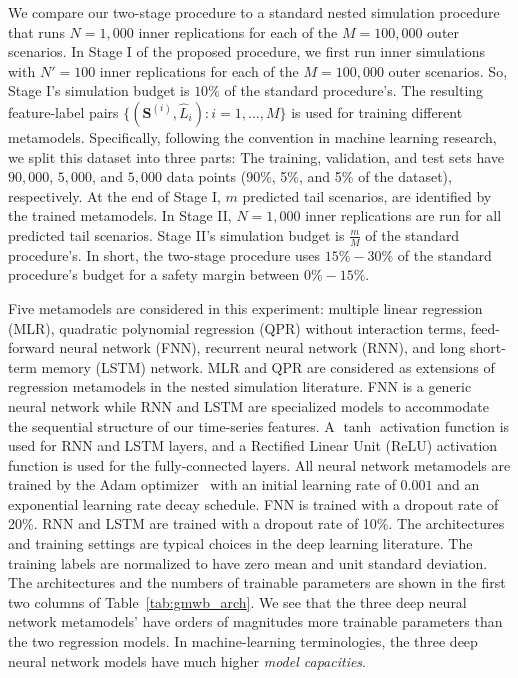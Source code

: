 \documentclass[]{article}
\newcommand{\bS}{\bm{S}}
\newcommand{\Lhat}{\widehat{L}}
\begin{document}
We compare our two-stage procedure to a standard nested simulation procedure that runs $N=1\!,\!000$ inner replications for each of the $M=100\!,\!000$ outer scenarios.
In Stage I of the proposed procedure, we first run inner simulations with $N'=100$ inner replications for each of the $M=100\!,\!000$ outer scenarios.
So, Stage I's simulation budget is $10\%$ of the standard procedure's.
The resulting feature-label pairs $\{(\bS^{(i)}, \Lhat_i): i=1,\ldots,M\}$ is used for training different  metamodels.
Specifically, following the convention in machine learning research, we split this dataset into three parts: The training, validation, and test sets have $90\!,\!000$, $5\!,\!000$, and $5\!,\!000$ data points (90\%, 5\%, and 5\% of the dataset), respectively.
At the end of Stage I, $m$ predicted tail scenarios, are identified by the trained metamodels.
In Stage II, $N=1\!,\!000$ inner replications are run for all predicted tail scenarios.
Stage II's simulation budget is $\frac{m}{M}$ of the standard procedure's.
In short, the two-stage procedure uses $15\% - 30\%$ of the standard procedure's budget for a safety margin between $0\% - 15\%$.

Five metamodels are considered in this experiment: multiple linear regression (MLR), quadratic polynomial regression (QPR) without interaction terms, feed-forward neural network (FNN), recurrent neural network (RNN), and long short-term memory (LSTM) network.
MLR and QPR are considered as extensions of regression metamodels in the nested simulation literature.
FNN is a generic neural network while RNN and LSTM are specialized models to accommodate the sequential structure of our time-series features.
A $\tanh$ activation function is used for RNN and LSTM layers, and a Rectified Linear Unit (ReLU) activation function is used for the fully-connected layers.
All neural network metamodels are trained by the Adam optimizer~\citep{kingma2014adam} with an initial learning rate of $0.001$ and an exponential learning rate decay schedule.
FNN is trained with a dropout rate of 20\%.
RNN and LSTM are trained with a dropout rate of 10\%.
The architectures and training settings are typical choices in the deep learning literature.
The training labels are normalized to have zero mean and unit standard deviation.
The architectures and the numbers of trainable parameters are shown in the first two columns of Table~\ref{tab:gmwb_arch}.
We see that the three deep neural network metamodels' have orders of magnitudes more trainable parameters than the two regression models.
In machine-learning terminologies, the three deep neural network models have much higher \textit{model capacities}.
\end{document}

